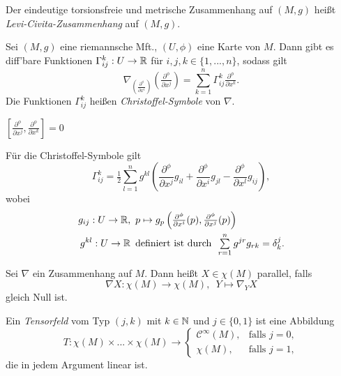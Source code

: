 \documentclass{cheat-sheet}
\newcommand{\coord}[1]{\tfrac{\partial^\phi}{\partial x^{#1}}} %
\newcommand{\Coord}[1]{\frac{\partial^\phi}{\partial x^{#1}}} %
\newcommand{\lie}[2]{\left[ {#1}, {#2} \right]} %
\begin{document}
\begin{defn}
  Der eindeutige torsionsfreie und metrische Zusammenhang auf $(M, g)$ heißt \emph{Levi-Civita-Zusammenhang} auf $(M, g)$.
\end{defn}

\begin{bem}
  Sei $(M, g)$ eine riemannsche Mft., $(U, \phi)$ eine Karte von $M$. Dann gibt es diff'bare Funktionen $\Gamma_{ij}^k : U \to \mathbb{R}$ für $i,j,k \in \{ 1, ..., n \}$, sodass gilt
  \[
    \nabla_{\left( \coord{i} \right)} \left( \coord{j} \right) = \sum_{k=1}^n \Gamma_{ij}^k \coord{k}.
  \]
  Die Funktionen $\Gamma_{ij}^k$ heißen \emph{Christoffel-Symbole} von $\nabla$.
\end{bem}


\begin{lem}
  $\lie{\coord{j}}{\coord{k}} = 0$
\end{lem}

\begin{satz}
  Für die Christoffel-Symbole gilt
  \[ \Gamma_{ij}^k = \tfrac{1}{2} \sum_{l=1}^n g^{kl} \left( \Coord{j} g_{il} + \Coord{i} g_{jl} - \Coord{l} g_{ij} \right), \]
  wobei
  \begin{align*}
    g_{ij} : U \to \R, & \enspace p \mapsto g_p \left( \coord{i} (p), \coord{j} (p) \right) \\
    g^{kl} : U \to \R & \enspace \text{definiert ist durch} \enspace \sum_{r=1}^n g^{jr} g_{rk} = \delta_k^j.
  \end{align*}
\end{satz}

\begin{defn}
  Sei $\nabla$ ein Zusammenhang auf $M$. Dann heißt $X \in \chi(M)$ parallel, falls
  \[ \nabla X : \chi(M) \to \chi(M), \enspace Y \mapsto \nabla_Y X \]
  gleich Null ist.
\end{defn}

\begin{defn}
  Ein \emph{Tensorfeld} vom Typ $(j, k)$ mit $k \in \mathbb{N}$ und $j \in \{ 0, 1 \}$ ist eine Abbildung
  \[
    T : \chi(M) \times ... \times \chi(M) \to
    \begin{cases}
      \mathcal{C}^\infty(M), & \text{falls } j = 0,\\
      \chi(M), & \text{falls } j = 1,
    \end{cases}
  \]
  die in jedem Argument linear ist.
\end{defn}
\end{document}

